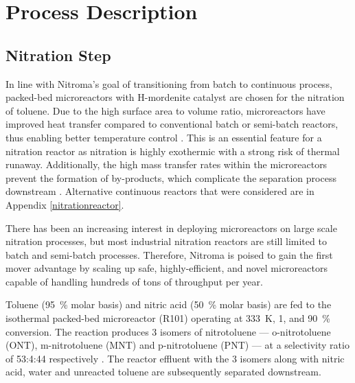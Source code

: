 \section{Process Description}
\label{sec:process}
\subsection{Nitration Step}
In line with Nitroma's goal of transitioning from batch to continuous process, packed-bed microreactors with H-mordenite catalyst are chosen for the nitration of toluene. Due to the high surface area to volume ratio, microreactors have improved heat transfer compared to conventional batch or semi-batch reactors, thus enabling better temperature control \cite{halder_nitration_2007}. This is an essential feature for a nitration reactor as nitration is highly exothermic with a strong risk of thermal runaway. Additionally, the high mass transfer rates within the microreactors prevent the formation of by-products, which complicate the separation process downstream \cite{halder_nitration_2007}.
Alternative continuous reactors that were considered are in Appendix \ref{nitrationreactor}. 

There has been an increasing interest in deploying microreactors on large scale nitration processes, but most industrial nitration reactors are still limited to batch and semi-batch processes. Therefore, Nitroma is poised to gain the first mover advantage by scaling up safe, highly-efficient, and novel microreactors capable of handling hundreds of tons of throughput per year.

Toluene (\SI{95}{\percent} molar basis) and nitric acid (\SI{50}{\percent} molar basis) are fed to the isothermal packed-bed microreactor (R101) operating at \SI{333}{\K}, \SI{1}{\atm}, and \SI{90}{\percent} conversion. The reaction produces 3 isomers of nitrotoluene --- o-nitrotoluene (ONT), m-nitrotoluene (MNT) and p-nitrotoluene (PNT) --- at a selectivity ratio of 53:4:44 respectively \cite{smith_novel_1998}. The reactor effluent with the 3 isomers along with nitric acid, water and unreacted toluene are subsequently separated downstream.



